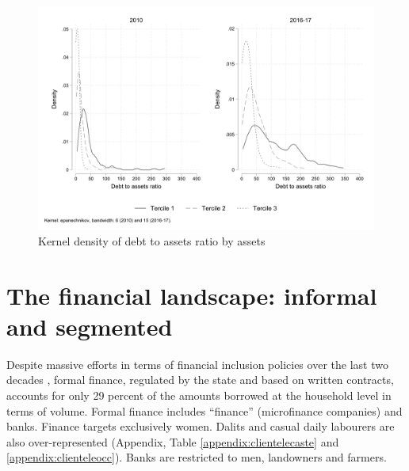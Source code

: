 \documentclass[a4paper, 11pt, onecolumn]{article}
\begin{document}
\begin{figure}[h!]
\center
\includegraphics[width=12cm]{DAR_tercile.png}
\caption{Kernel density of debt to assets ratio by assets}
\label{kernel:DARassets}
\end{figure}















\section{The financial landscape: informal and segmented}
\label{section:finlandscape}

Despite massive efforts in terms of financial inclusion policies over the last two decades \citep{Nair2016, Kar2018}, formal finance, regulated by the state and based on written contracts, accounts for only 29 percent of the amounts borrowed at the household level in terms of volume. 
Formal finance includes ``finance'' (microfinance companies) and banks. 
Finance targets exclusively women. 
Dalits and casual daily labourers are also over-represented (Appendix, Table \ref{appendix:clientelecaste} and \ref{appendix:clienteleocc}). 
Banks are restricted to men, landowners and farmers. 
\end{document}
